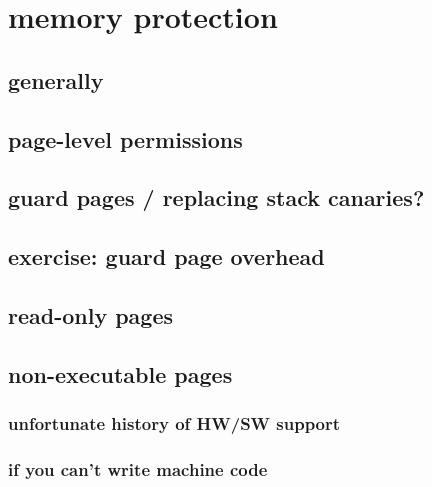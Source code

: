 
\section{memory protection}
\subsection{generally}


\subsection{page-level permissions}


\subsection{guard pages / replacing stack canaries?}


\subsection{exercise: guard page overhead}


\subsection{read-only pages}


\subsection{non-executable pages}


\subsubsection{unfortunate history of HW/SW support}


\subsubsection{if you can't write machine code}


